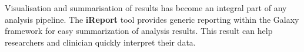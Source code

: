 Visualisation and summarisation of results has become an integral part of any analysis pipeline. The \textbf{iReport} tool provides generic reporting within the Galaxy framework for easy summarization of analysis results. This result can help researchers and clinician quickly interpret their data.


\begin{comment}
Contents of this chapter:
\begin{enumerate}
\itemsep-0.5em
\item The Galaxy platform for accessible, reprodu- cible and collaborative biomedical analyses: 2018 update
\item iReport: A generalised Galaxy solution for integrated experimental reporting
\item Galactic Circos: User-friendly creation of Circos Plots within the Galaxy platform
\end{enumerate}
\end{comment}
